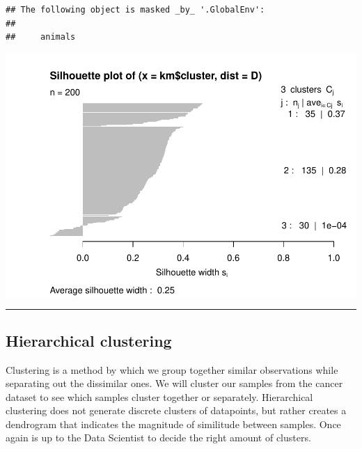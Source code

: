 \documentclass[
]{book}
\newenvironment{Shaded}{\begin{snugshade}}{\end{snugshade}}
\newcommand{\AttributeTok}[1]{\textcolor[rgb]{0.13,0.29,0.53}{#1}}
\newcommand{\CommentTok}[1]{\textcolor[rgb]{0.56,0.35,0.01}{\textit{#1}}}
\newcommand{\DecValTok}[1]{\textcolor[rgb]{0.00,0.00,0.81}{#1}}
\newcommand{\FunctionTok}[1]{\textcolor[rgb]{0.13,0.29,0.53}{\textbf{#1}}}
\newcommand{\NormalTok}[1]{#1}
\newcommand{\OtherTok}[1]{\textcolor[rgb]{0.56,0.35,0.01}{#1}}
\newcommand{\SpecialCharTok}[1]{\textcolor[rgb]{0.81,0.36,0.00}{\textbf{#1}}}
\begin{document}
\begin{verbatim}
## The following object is masked _by_ '.GlobalEnv':
## 
##     animals
\end{verbatim}

\begin{Shaded}
\end{Shaded}

\includegraphics{_main_files/figure-latex/unnamed-chunk-74-1.pdf}

\begin{center}\rule{0.5\linewidth}{0.5pt}\end{center}

\hypertarget{hierarchical-clustering}{%
\subsection{Hierarchical clustering}\label{hierarchical-clustering}}

Clustering is a method by which we group together similar observations while separating out the dissimilar ones. We will cluster our samples from the cancer dataset to see which samples cluster together or separately. Hierarchical clustering does not generate discrete clusters of datapoints, but rather creates a dendrogram that indicates the magnitude of similitude between samples. Once again is up to the Data Scientist to decide the right amount of clusters.
\end{document}
